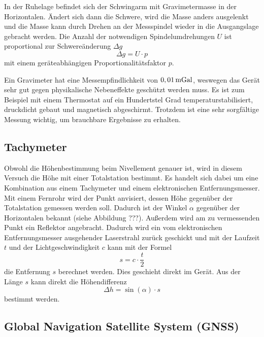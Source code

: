 In der Ruhelage befindet sich der Schwingarm mit Gravimetermasse in der Horizontalen. Ändert sich dann die Schwere, wird die Masse anders ausgelenkt und die Masse kann durch Drehen an der Messspindel wieder in die Ausgangslage gebracht werden. Die Anzahl der notwendigen Spindelumdrehungen $U$ ist proportional zur Schwereänderung $\Delta g$
\begin{equation}
 \Delta g= U\cdot p
\end{equation}
mit einem geräteabhängigen Proportionalitätsfaktor $p$.

Ein Gravimeter hat eine Messempfindlichkeit von $0,01\,\mathrm{mGal}$, weswegen das Gerät sehr gut gegen physikalische Nebeneffekte geschützt werden muss. Es ist zum Beispiel mit einem Thermostat auf ein Hundertstel Grad temperaturstabilisiert, druckdicht gebaut und magnetisch abgeschirmt. Trotzdem ist eine sehr sorgfältige Messung wichtig, um brauchbare Ergebnisse zu erhalten. 

\subsection{Tachymeter}

Obwohl die Höhenbestimmung beim Nivellement genauer ist, wird in diesem Versuch die Höhe mit einer Totalstation bestimmt. Es handelt sich dabei um eine Kombination aus einem Tachymeter und einem elektronischen Entfernungsmesser. Mit einem Fernrohr wird der Punkt anvisiert, dessen Höhe gegenüber der Totalstation gemessen werden soll. Dadurch ist der Winkel $\alpha$ gegenüber der Horizontalen bekannt (siehe Abbildung ???). Außerdem wird am zu vermessenden Punkt ein Reflektor angebracht. Dadurch wird ein vom elektronischen Entfernungsmesser ausgehender Laserstrahl zurück geschickt und mit der Laufzeit $t$ und der Lichtgeschwindigkeit $c$ kann mit der Formel
\begin{equation}
 s=c\cdot \frac{t}{2}
\end{equation}
die Entfernung $s$ berechnet werden. Dies geschieht direkt im Gerät. Aus der Länge $s$ kann direkt die Höhendifferenz
\begin{equation}
 \Delta h=\sin(\alpha)\cdot s
\end{equation}
bestimmt werden. 

\subsection{Global Navigation Satellite System (GNSS)}


